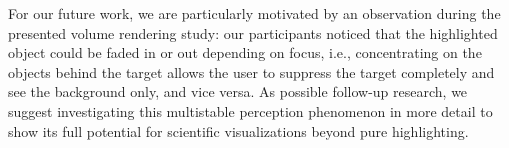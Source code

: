 \documentclass[journal]{vgtc}                %
\begin{document}
For our future work, we are particularly motivated by an observation during the presented volume rendering study: our participants noticed that the highlighted object could be faded in or out depending on focus, i.e., concentrating on the objects behind the target allows the user to suppress the target completely and see the background only, and vice versa. As possible follow-up research, we suggest investigating this multistable perception phenomenon in more detail to show its full potential for scientific visualizations beyond pure highlighting. 













































\end{document}
